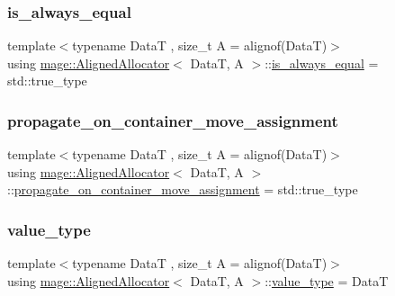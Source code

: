 \subsubsection{\texorpdfstring{is\+\_\+always\+\_\+equal}{is\_always\_equal}}
{\footnotesize\ttfamily template$<$typename DataT , size\+\_\+t A = alignof(\+Data\+T)$>$ \\
using \mbox{\hyperlink{classmage_1_1_aligned_allocator}{mage\+::\+Aligned\+Allocator}}$<$ DataT, A $>$\+::\mbox{\hyperlink{classmage_1_1_aligned_allocator_a8e5be98ed33a6dd84f72b75ee07753e7}{is\+\_\+always\+\_\+equal}} =  std\+::true\+\_\+type}

\mbox{\label{classmage_1_1_aligned_allocator_abca6b6297d4362cb1811015587a13f74}} 
\subsubsection{\texorpdfstring{propagate\+\_\+on\+\_\+container\+\_\+move\+\_\+assignment}{propagate\_on\_container\_move\_assignment}}
{\footnotesize\ttfamily template$<$typename DataT , size\+\_\+t A = alignof(\+Data\+T)$>$ \\
using \mbox{\hyperlink{classmage_1_1_aligned_allocator}{mage\+::\+Aligned\+Allocator}}$<$ DataT, A $>$\+::\mbox{\hyperlink{classmage_1_1_aligned_allocator_abca6b6297d4362cb1811015587a13f74}{propagate\+\_\+on\+\_\+container\+\_\+move\+\_\+assignment}} =  std\+::true\+\_\+type}

\mbox{\label{classmage_1_1_aligned_allocator_a6299143bce3deec35202884eedfa5065}} 
\subsubsection{\texorpdfstring{value\+\_\+type}{value\_type}}
{\footnotesize\ttfamily template$<$typename DataT , size\+\_\+t A = alignof(\+Data\+T)$>$ \\
using \mbox{\hyperlink{classmage_1_1_aligned_allocator}{mage\+::\+Aligned\+Allocator}}$<$ DataT, A $>$\+::\mbox{\hyperlink{classmage_1_1_aligned_allocator_a6299143bce3deec35202884eedfa5065}{value\+\_\+type}} =  DataT}

